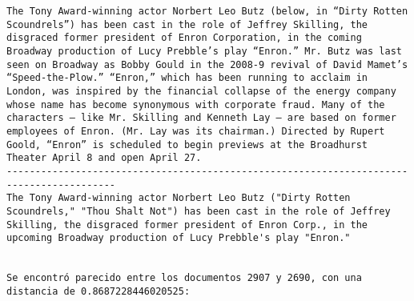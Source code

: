 \documentclass[11pt]{article}
\begin{document}
\begin{Verbatim}[commandchars=\\\{\}]
The Tony Award-winning actor Norbert Leo Butz (below, in “Dirty Rotten Scoundrels”) has been cast in the role of Jeffrey Skilling, the disgraced former president of Enron Corporation, in the coming Broadway production of Lucy Prebble’s play “Enron.” Mr. Butz was last seen on Broadway as Bobby Gould in the 2008-9 revival of David Mamet’s “Speed-the-Plow.” “Enron,” which has been running to acclaim in London, was inspired by the financial collapse of the energy company whose name has become synonymous with corporate fraud. Many of the characters — like Mr. Skilling and Kenneth Lay — are based on former employees of Enron. (Mr. Lay was its chairman.) Directed by Rupert Goold, “Enron” is scheduled to begin previews at the Broadhurst Theater April 8 and open April 27.
-----------------------------------------------------------------------------------------
The Tony Award-winning actor Norbert Leo Butz ("Dirty Rotten Scoundrels," "Thou Shalt Not") has been cast in the role of Jeffrey Skilling, the disgraced former president of Enron Corp., in the upcoming Broadway production of Lucy Prebble's play "Enron."


Se encontró parecido entre los documentos 2907 y 2690, con una distancia de 0.8687228446020525:



\end{Verbatim}
\end{document}
